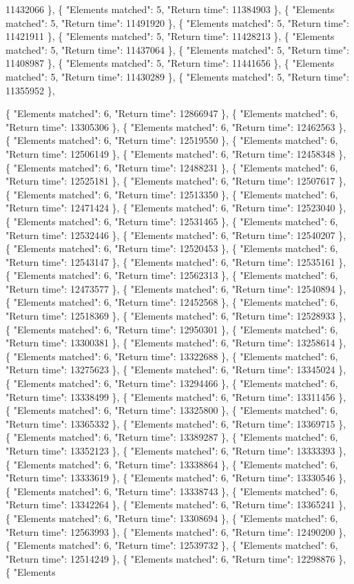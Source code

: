 11432066 \}, \{ "Elements matched": 5, "Return time": 11384903 \}, \{ "Elements matched": 5, "Return time": 11491920 \}, \{ "Elements matched": 5, "Return time": 11421911 \}, \{ "Elements matched": 5, "Return time": 11428213 \}, \{ "Elements matched": 5, "Return time": 11437064 \}, \{ "Elements matched": 5, "Return time": 11408987 \}, \{ "Elements matched": 5, "Return time": 11441656 \}, \{ "Elements matched": 5, "Return time": 11430289 \}, \{ "Elements matched": 5, "Return time": 11355952 \},

 \{ "Elements matched": 6, "Return time": 12866947 \}, \{ "Elements matched": 6, "Return time": 13305306 \}, \{ "Elements matched": 6, "Return time": 12462563 \}, \{ "Elements matched": 6, "Return time": 12519550 \}, \{ "Elements matched": 6, "Return time": 12506149 \}, \{ "Elements matched": 6, "Return time": 12458348 \}, \{ "Elements matched": 6, "Return time": 12488231 \}, \{ "Elements matched": 6, "Return time": 12525181 \}, \{ "Elements matched": 6, "Return time": 12507617 \}, \{ "Elements matched": 6, "Return time": 12513350 \}, \{ "Elements matched": 6, "Return time": 12471424 \}, \{ "Elements matched": 6, "Return time": 12523040 \}, \{ "Elements matched": 6, "Return time": 12531465 \}, \{ "Elements matched": 6, "Return time": 12532446 \}, \{ "Elements matched": 6, "Return time": 12540207 \}, \{ "Elements matched": 6, "Return time": 12520453 \}, \{ "Elements matched": 6, "Return time": 12543147 \}, \{ "Elements matched": 6, "Return time": 12535161 \}, \{ "Elements matched": 6, "Return time": 12562313 \}, \{ "Elements matched": 6, "Return time": 12473577 \}, \{ "Elements matched": 6, "Return time": 12540894 \}, \{ "Elements matched": 6, "Return time": 12452568 \}, \{ "Elements matched": 6, "Return time": 12518369 \}, \{ "Elements matched": 6, "Return time": 12528933 \}, \{ "Elements matched": 6, "Return time": 12950301 \}, \{ "Elements matched": 6, "Return time": 13300381 \}, \{ "Elements matched": 6, "Return time": 13258614 \}, \{ "Elements matched": 6, "Return time": 13322688 \}, \{ "Elements matched": 6, "Return time": 13275623 \}, \{ "Elements matched": 6, "Return time": 13345024 \}, \{ "Elements matched": 6, "Return time": 13294466 \}, \{ "Elements matched": 6, "Return time": 13338499 \}, \{ "Elements matched": 6, "Return time": 13311456 \}, \{ "Elements matched": 6, "Return time": 13325800 \}, \{ "Elements matched": 6, "Return time": 13365332 \}, \{ "Elements matched": 6, "Return time": 13369715 \}, \{ "Elements matched": 6, "Return time": 13389287 \}, \{ "Elements matched": 6, "Return time": 13352123 \}, \{ "Elements matched": 6, "Return time": 13333393 \}, \{ "Elements matched": 6, "Return time": 13338864 \}, \{ "Elements matched": 6, "Return time": 13333619 \}, \{ "Elements matched": 6, "Return time": 13330546 \}, \{ "Elements matched": 6, "Return time": 13338743 \}, \{ "Elements matched": 6, "Return time": 13342264 \}, \{ "Elements matched": 6, "Return time": 13365241 \}, \{ "Elements matched": 6, "Return time": 13308694 \}, \{ "Elements matched": 6, "Return time": 12563993 \}, \{ "Elements matched": 6, "Return time": 12490200 \}, \{ "Elements matched": 6, "Return time": 12539732 \}, \{ "Elements matched": 6, "Return time": 12514249 \}, \{ "Elements matched": 6, "Return time": 12298876 \}, \{ "Elements 